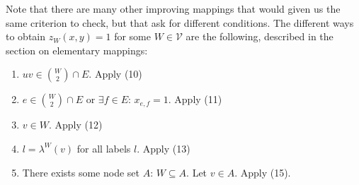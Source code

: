 \begin{enumerate}
    Note that there are many other improving mappings that would given us the same criterion to check, but that ask for different conditions. The different ways to obtain $z_W(x,y)=1$ for some $W \in \mathcal{V}$ are the following, described in the section on elementary mappings: 
    \begin{enumerate}
        \item $uv \in \binom{W}{2} \cap E$. Apply (10)
        \item $e \in \binom{W}{2} \cap E$ or $\exists f \in E$: $x_{e,f}=1$. Apply (11)
        \item $v \in W$. Apply (12)
        \item $l=\lambda^W(v)$ for all labels $l$. Apply (13)
        \item There exists some node set $A$: $W \subseteq A$. Let $v \in A$. Apply (15). 
    \end{enumerate}
    

\end{enumerate}
